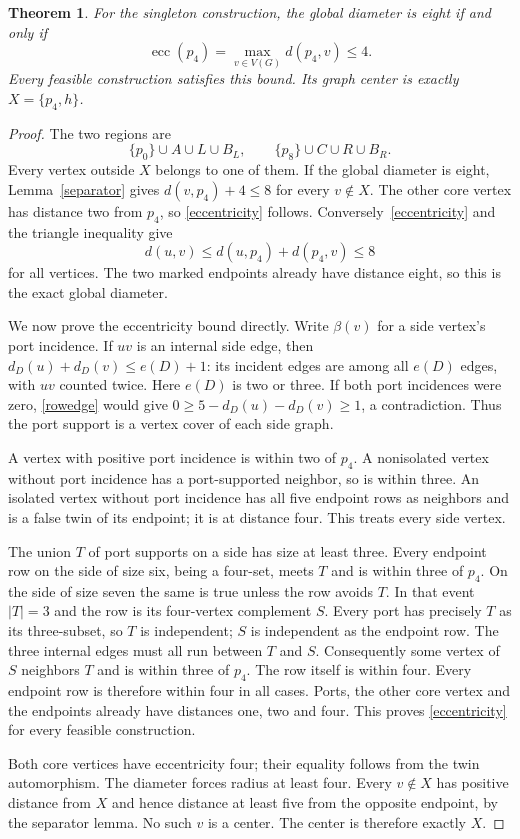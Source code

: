 \documentclass[11pt]{article}
\newtheorem{theorem}{Theorem}
\begin{document}
\begin{theorem}\label{diameter}
For the singleton construction, the global diameter is eight if and
only if
\begin{equation}\label{eccentricity}
 \operatorname{ecc}(p_4)=\max_{v\in V(G)}d(p_4,v)\leq4.
\end{equation}
Every feasible construction satisfies this bound. Its graph center is
exactly $X=\{p_4,h\}$.
\end{theorem}
\begin{proof}
The two regions are
\[
 \{p_0\}\cup A\cup L\cup B_L,
 \qquad \{p_8\}\cup C\cup R\cup B_R.
\]
Every vertex outside $X$ belongs to one of them. If the global diameter
is eight, Lemma~\ref{separator} gives $d(v,p_4)+4\leq8$ for every
$v\notin X$. The other core vertex has distance two from $p_4$, so
\eqref{eccentricity} follows. Conversely~\eqref{eccentricity} and the
triangle inequality give
\[
 d(u,v)\leq d(u,p_4)+d(p_4,v)\leq8
\]
for all vertices. The two marked endpoints already have distance eight,
so this is the exact global diameter.

We now prove the eccentricity bound directly. Write $\beta(v)$ for a
side vertex's port incidence. If $uv$ is an internal side edge, then
$d_D(u)+d_D(v)\leq e(D)+1$: its incident edges are among all $e(D)$
edges, with $uv$ counted twice. Here $e(D)$ is two or three. If both
port incidences were zero, \eqref{rowedge} would give
$0\geq5-d_D(u)-d_D(v)\geq1$, a contradiction. Thus the port support
is a vertex cover of each side graph.

A vertex with positive port incidence is within two of $p_4$. A
nonisolated vertex without port incidence has a port-supported neighbor,
so is within three. An isolated vertex without port incidence has all
five endpoint rows as neighbors and is a false twin of its endpoint;
it is at distance four. This treats every side vertex.

The union $T$ of port supports on a side has size at least three. Every
endpoint row on the side of size six, being a four-set, meets $T$ and
is within three of $p_4$. On the side of size seven the same is true
unless the row avoids $T$. In that event $|T|=3$ and the row is its
four-vertex complement $S$. Every port has precisely $T$ as its
three-subset, so $T$ is independent; $S$ is independent as the endpoint
row. The three internal edges must all run between $T$ and $S$.
Consequently some vertex of $S$ neighbors $T$ and is within three of
$p_4$. The row itself is within four. Every endpoint row is therefore
within four in all cases. Ports, the other core vertex and the endpoints
already have distances one, two and four. This proves
\eqref{eccentricity} for every feasible construction.

Both core vertices have eccentricity four; their equality follows from
the twin automorphism. The diameter forces radius at least four.
Every $v\notin X$ has positive distance from $X$ and hence distance
at least five from the opposite endpoint, by the separator lemma.
No such $v$ is a center. The center is therefore exactly $X$.
\end{proof}
\end{document}
